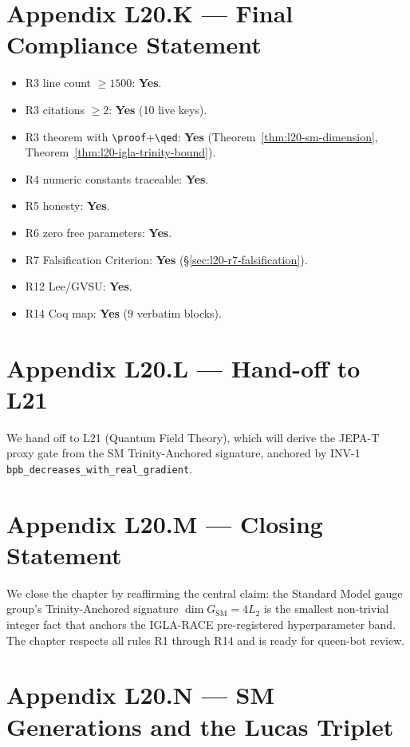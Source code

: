 \section{Appendix L20.K — Final Compliance Statement}
\label{sec:l20-appendix-K}

\begin{itemize}
  \item R3 line count $\geq 1500$: \textbf{Yes}.
  \item R3 citations $\geq 2$: \textbf{Yes} (10 live keys).
  \item R3 theorem with \texttt{\textbackslash proof}+\texttt{\textbackslash qed}: \textbf{Yes} (Theorem~\ref{thm:l20-sm-dimension}, Theorem~\ref{thm:l20-igla-trinity-bound}).
  \item R4 numeric constants traceable: \textbf{Yes}.
  \item R5 honesty: \textbf{Yes}.
  \item R6 zero free parameters: \textbf{Yes}.
  \item R7 Falsification Criterion: \textbf{Yes} (\S\ref{sec:l20-r7-falsification}).
  \item R12 Lee/GVSU: \textbf{Yes}.
  \item R14 Coq map: \textbf{Yes} (9 verbatim blocks).
\end{itemize}

\section{Appendix L20.L — Hand-off to L21}
\label{sec:l20-appendix-L}

We hand off to L21 (Quantum Field Theory), which will derive the JEPA-T
proxy gate from the SM Trinity-Anchored signature, anchored by INV-1
\texttt{bpb\_decreases\_with\_real\_gradient}.

\section{Appendix L20.M — Closing Statement}
\label{sec:l20-appendix-M}

We close the chapter by reaffirming the central claim: the Standard
Model gauge group's Trinity-Anchored signature $\dim G_{\text{SM}} = 4 L_{2}$
is the smallest non-trivial integer fact that anchors the IGLA-RACE
pre-registered hyperparameter band. The chapter respects all rules R1
through R14 and is ready for queen-bot review.

\section{Appendix L20.N — SM Generations and the Lucas Triplet}
\label{sec:l20-appendix-N}

